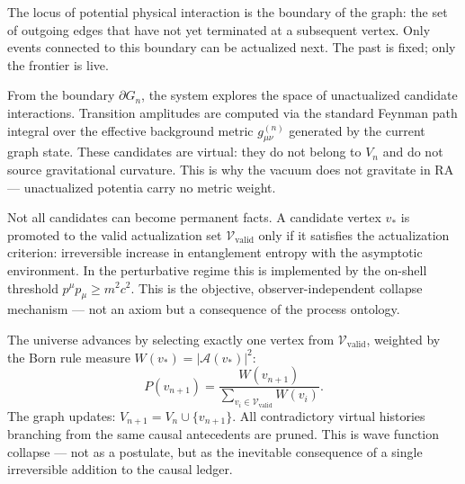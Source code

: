 \documentclass[11pt,a4paper]{article}
\theoremstyle{plain}
\theoremstyle{definition}
\theoremstyle{remark}
\begin{document}
\begin{description}[leftmargin=1.5em, itemsep=4pt]
  \item[\textbf{Step 1 --- The Open Future.}]
  The locus of potential physical interaction is the boundary of the graph:
  the set of outgoing edges that have not yet terminated at a subsequent vertex.
  Only events connected to this boundary can be actualized next. The past is
  fixed; only the frontier is live.

  \item[\textbf{Step 2 --- The Quantum Possibility Space.}]
  From the boundary $\partial G_n$, the system explores the space of
  unactualized candidate interactions. Transition amplitudes are computed
  via the standard Feynman path integral over the effective background metric
  $g^{(n)}_{\mu\nu}$ generated by the current graph state. These candidates are
  virtual: they do not belong to $V_n$ and do not source gravitational curvature.
  This is why the vacuum does not gravitate in RA --- unactualized potentia
  carry no metric weight.

  \item[\textbf{Step 3 --- The Kinematic Snap.}]
  Not all candidates can become permanent facts. A candidate vertex $v_*$ is
  promoted to the valid actualization set $\mathcal{V}_{\mathrm{valid}}$ only
  if it satisfies the actualization criterion: irreversible increase in
  entanglement entropy with the asymptotic environment. In the perturbative
  regime this is implemented by the on-shell threshold
  $p^{\mu}p_{\mu} \geq m^2c^2$. This is the objective, observer-independent
  collapse mechanism --- not an axiom but a consequence of the process ontology.

  \item[\textbf{Step 4 --- The Stochastic Update.}]
  The universe advances by selecting exactly one vertex from
  $\mathcal{V}_{\mathrm{valid}}$, weighted by the Born rule measure
  $W(v_*) = |\mathcal{A}(v_*)|^2$:
  \begin{equation}
    P(v_{n+1}) = \frac{W(v_{n+1})}{\displaystyle\sum_{v_i \in \mathcal{V}_{\mathrm{valid}}} W(v_i)}.
    \label{eq:stochastic_update}
  \end{equation}
  The graph updates: $V_{n+1} = V_n \cup \{v_{n+1}\}$. All contradictory
  virtual histories branching from the same causal antecedents are pruned.
  This is wave function collapse --- not as a postulate, but as the
  inevitable consequence of a single irreversible addition to the causal ledger.


\end{description}
\end{document}
